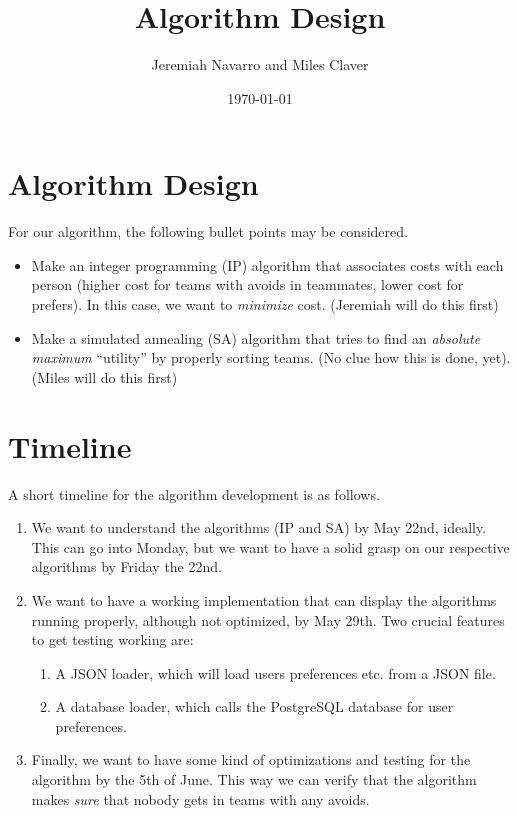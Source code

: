 \documentclass[11pt]{article}
\title{Algorithm Design}
\author{Jeremiah Navarro and Miles Claver}
\date{\today}
\begin{document}
\maketitle


\section{Algorithm Design}
For our algorithm, the following bullet points may be considered.
\begin{itemize} %
   \item Make an integer programming (IP) algorithm that associates costs with each person (higher cost for teams with avoids in teammates, lower cost for prefers). In this case, we want to \textit{minimize} cost. (Jeremiah will do this first)
   \item Make a simulated annealing (SA) algorithm that tries to find an \textit{absolute maximum} ``utility'' by properly sorting teams. (No clue how this is done, yet). (Miles will do this first)
\end{itemize}

\section{Timeline}
A short timeline for the algorithm development is as follows.
\begin{enumerate} %
	\item We want to understand the algorithms (IP and SA) by May 22nd, ideally. This can go into Monday, but we want to have a solid grasp on our respective algorithms by Friday the 22nd.
	\item We want to have a working implementation that can display the algorithms running properly, although not optimized, by May 29th. Two crucial features to get testing working are:
	\begin{enumerate} %
		\item A JSON loader, which will load users preferences etc. from a JSON file.
		\item A database loader, which calls the PostgreSQL database for user preferences.
	\end{enumerate}
	\item Finally, we want to have some kind of optimizations and testing for the algorithm by the 5th of June. This way we can verify that the algorithm makes \textit{sure} that nobody gets in teams with any avoids.
\end{enumerate}
\end{document}
